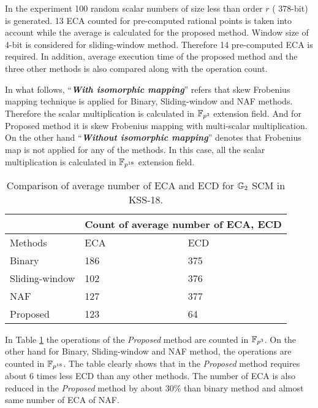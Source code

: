 In the experiment 100 random scalar numbers of size less than order $r$ ( 378-bit) is generated.
13  ECA counted for pre-computed rational points is taken into account while the average is calculated for the proposed method.
Window size of 4-bit is considered for sliding-window method. 
Therefore 14 pre-computed ECA is required. 
In addition, average execution time of the proposed method and the three other methods is also compared along with the operation count.

In what follows, ``\textit{\textbf{With isomorphic mapping}}'' refers that  skew Frobenius mapping technique is applied for Binary, Sliding-window and NAF methods. Therefore the scalar multiplication is calculated in $\mathbb{F}_{p^3}$ extension field.
And for Proposed method it is skew Frobenius mapping with multi-scalar multiplication. 
On the other hand ``\textit{\textbf{Without isomorphic mapping}}'' denotes that Frobenius map is not applied for any of the methods.
In this case, all the scalar multiplication is calculated in $\mathbb{F}_{p^{18}}$ extension field.

\renewcommand{\baselinestretch}{1.5}
\begin{table}[ht]
	\centering
\caption{Comparison of average number of ECA and ECD for ${\mathbb{G}}_{2}$ SCM in KSS-18.}
\label{table:operationcount_chapter_g2scm_kss18}
\begin{tabular}{l|l|l|}
	\cline{2-3}
	& \multicolumn{2}{l|}{Count of average number of ECA, ECD} \\ \hline
	\multicolumn{1}{|l|}{Methods}        & ECA      \quad     \quad       \quad \quad     \quad       \quad       & ECD                        \\ \hline
	\multicolumn{1}{|l|}{Binary}         & 186                         & 375                        \\ \hline
	\multicolumn{1}{|l|}{Sliding-window} & 102                         & 376                        \\ \hline
	\multicolumn{1}{|l|}{NAF}            & 127                         & 377                        \\ \hline
	\multicolumn{1}{|l|}{Proposed}       & 123                         & 64                         \\ \hline
\end{tabular}
\end{table}
\renewcommand{\baselinestretch}{1.0}
In Table \ref{table:operationcount_chapter_g2scm_kss18} the operations of the \textit{Proposed} method are counted in $\mathbb{F}_{p^3}$. On the other hand for Binary, Sliding-window and NAF method, the operations are counted in $\mathbb{F}_{p^{18}}$.  The table clearly shows that in the \textit{Proposed} method requires about 6 times less ECD than any other methods.
The number of ECA is also reduced in the \textit{Proposed} method by about 30\% than binary method and almost same number of ECA of NAF. 

